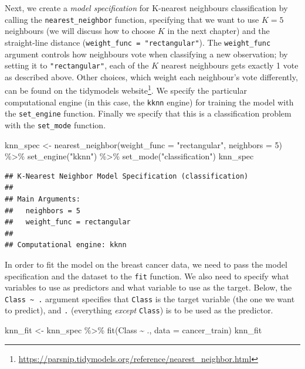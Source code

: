 \documentclass[
]{krantz}
\makeatletter
\newenvironment{Shaded}{\begin{snugshade}}{\end{snugshade}}
\newcommand{\AttributeTok}[1]{\textcolor[rgb]{0.61,0.61,0.61}{#1}}
\newcommand{\DecValTok}[1]{\textcolor[rgb]{0.06,0.06,0.06}{#1}}
\newcommand{\FunctionTok}[1]{\textcolor[rgb]{0,0,0}{#1}}
\newcommand{\NormalTok}[1]{#1}
\newcommand{\OtherTok}[1]{\textcolor[rgb]{0.37,0.37,0.37}{#1}}
\newcommand{\SpecialCharTok}[1]{\textcolor[rgb]{0,0,0}{#1}}
\newcommand{\StringTok}[1]{\textcolor[rgb]{0.5,0.5,0.5}{#1}}
\renewcommand{\href}[2]{#2\footnote{\url{#1}}}
\newenvironment{kframe}{%
\medskip{}
\setlength{\fboxsep}{.8em}
 \def\at@end@of@kframe{}%
 \ifinner\ifhmode%
  \def\at@end@of@kframe{\end{minipage}}%
  \begin{minipage}{\columnwidth}%
 \fi\fi%
 \def\FrameCommand##1{\hskip\@totalleftmargin \hskip-\fboxsep
 \colorbox{shadecolor}{##1}\hskip-\fboxsep
     \hskip-\linewidth \hskip-\@totalleftmargin \hskip\columnwidth}%
 \MakeFramed {\advance\hsize-\width
   \@totalleftmargin\z@ \linewidth\hsize
   \@setminipage}}%
 {\par\unskip\endMakeFramed%
 \at@end@of@kframe}
\renewenvironment{Shaded}{\begin{kframe}}{\end{kframe}}
\makeatother
\begin{document}
Next, we create a \emph{model specification} for K-nearest neighbours classification
by calling the \texttt{nearest\_neighbor} function, specifying that we want to use \(K = 5\) neighbours
(we will discuss how to choose \(K\) in the next chapter) and the straight-line
distance (\texttt{weight\_func\ =\ "rectangular"}). The \texttt{weight\_func} argument controls
how neighbours vote when classifying a new observation; by setting it to \texttt{"rectangular"},
each of the \(K\) nearest neighbours gets exactly 1 vote as described above. Other choices,
which weight each neighbour's vote differently, can be found on
\href{https://parsnip.tidymodels.org/reference/nearest_neighbor.html}{the tidymodels website}.
We specify the particular computational
engine (in this case, the \texttt{kknn} engine) for training the model with the \texttt{set\_engine} function.
Finally we specify that this is a classification problem with the \texttt{set\_mode} function.

\begin{Shaded}
\begin{Highlighting}[]
\NormalTok{knn\_spec }\OtherTok{\textless{}{-}} \FunctionTok{nearest\_neighbor}\NormalTok{(}\AttributeTok{weight\_func =} \StringTok{"rectangular"}\NormalTok{, }\AttributeTok{neighbors =} \DecValTok{5}\NormalTok{) }\SpecialCharTok{\%\textgreater{}\%}
  \FunctionTok{set\_engine}\NormalTok{(}\StringTok{"kknn"}\NormalTok{) }\SpecialCharTok{\%\textgreater{}\%}
  \FunctionTok{set\_mode}\NormalTok{(}\StringTok{"classification"}\NormalTok{)}
\NormalTok{knn\_spec}
\end{Highlighting}
\end{Shaded}

\begin{verbatim}
## K-Nearest Neighbor Model Specification (classification)
## 
## Main Arguments:
##   neighbors = 5
##   weight_func = rectangular
## 
## Computational engine: kknn
\end{verbatim}

In order to fit the model on the breast cancer data, we need to pass the model specification
and the dataset to the \texttt{fit} function. We also need to specify what variables to use as predictors
and what variable to use as the target. Below, the \texttt{Class\ \textasciitilde{}\ .} argument specifies
that \texttt{Class} is the target variable (the one we want to predict),
and \texttt{.} (everything \emph{except} \texttt{Class}) is to be used as the predictor.

\begin{Shaded}
\begin{Highlighting}[]
\NormalTok{knn\_fit }\OtherTok{\textless{}{-}}\NormalTok{ knn\_spec }\SpecialCharTok{\%\textgreater{}\%}
  \FunctionTok{fit}\NormalTok{(Class }\SpecialCharTok{\textasciitilde{}}\NormalTok{ ., }\AttributeTok{data =}\NormalTok{ cancer\_train)}
\NormalTok{knn\_fit}
\end{Highlighting}
\end{Shaded}
\end{document}
